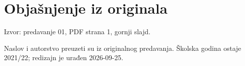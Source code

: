 
\section*{Objašnjenje iz originala}

Izvor: predavanje 01, PDF strana 1, gornji slajd.


Naslov i autorstvo preuzeti su iz originalnog predavanja. Školska godina ostaje 2021/22; redizajn je urađen 2026-09-25.


